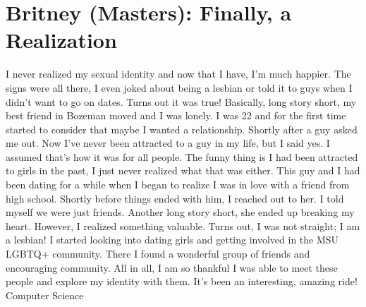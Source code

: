 \section*{Britney (Masters): Finally, a Realization}
I never realized my sexual identity and now that I have, I’m much happier. 
The signs were all there, I even joked about being a lesbian or told it to 
guys when I didn’t want to go on dates. Turns out it was true! Basically, long 
story short, my best friend in Bozeman moved and I was lonely. I was 22 and for
the first time started to consider that maybe I wanted a relationship. Shortly 
after a guy asked me out. Now I’ve never been attracted to a guy in my life, 
but I said yes. I assumed that’s how it was for all people. The funny thing is 
I had been attracted to girls in the past, I just never realized what that was 
either. This guy and I had been dating for a while when I began to realize I 
was in love with a friend from high school. Shortly before things ended with 
him, I reached out to her. I told myself we were just friends. Another long 
story short, she ended up breaking my heart. However, I realized something 
valuable. Turns out, I was not straight; I am a lesbian! I started looking into 
dating girls and getting involved in the MSU LGBTQ+ community. There I found a 
wonderful group of friends and encouraging community. All in all, I am so 
thankful I was able to meet these people and explore my identity with them. 
It’s been an interesting, amazing ride! \\
Computer Science
